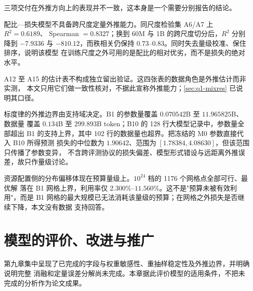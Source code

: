 \documentclass[bwprint]{gmcmthesis}
\numberwithin{equation}{section}
\numberwithin{figure}{section}
\numberwithin{table}{section}
\begin{document}
三项交付在外推方向上的表现并不一致，这本身是一个需要分别报告的结论。

配比—损失模型不具备跨尺度定量外推能力。同尺度检验集 A6/A7 上 $R^2=0.6189$、
Spearman $=0.8327$；换到 60M 与 1B 的跨尺度切分后，$R^2$ 分别降到 $-7.9336$ 与
$-810.12$，而秩相关仍保持 $0.73$--$0.83$。同时失去量级校准、保住排序，说明该模型
在训练尺度之外可用的是配比的相对优劣，而不是损失的绝对水平。

A12 至 A15 的估计表不构成独立留出验证。这四张表的数据角色是外推估计而非实测，
本文只用它们做一致性核对，不据此宣称外推能力；\ref{sec:q1-mixres} 已说明其口径。

标度律的外推边界由支持域决定。B1 的参数量覆盖 $0.070542$B 至 $11.965825$B、数据量
覆盖 $0.134$B 至 $299.893$B token；B10 的 128 行大模型记录中，参数量全部超出
B1 的支持上界，其中 102 行的数据量也超界。把冻结的 M0 参数直接代入 B10 所得预测
损失的中位数为 $1.90642$、范围为 $[1.78384,4.08630]$，但该范围只传播了参数变异，
不含跨评测协议的损失偏差、模型形式错设与远距离外推误差，故只作量级讨论。

资源配置侧的分布偏移体现在预算量级上。$10^{24}$ 档的 1176 个网格点全部可行、最优解
落在 B1 网格上界，利用率仅 $2.300\%$--$11.560\%$。这不是"预算未被有效利用"，而是
B1 网格的最大规模已无法消耗该量级的预算；在网格之外损失是否继续下降，本文没有数据
支持回答。



\clearpage
\section{模型的评价、改进与推广}

第九章集中呈现了已完成的字段与权重敏感性、重抽样稳定性及外推边界，并明确说明完整
消融和定量误差分解尚未完成。本章据此评价模型的适用条件，不把未完成的分析作为论文成果。
%
\end{document}
